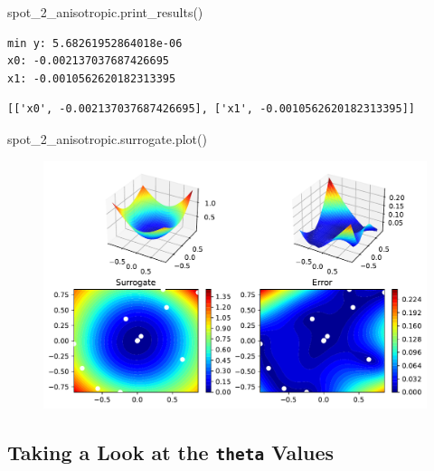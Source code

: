 \documentclass[
  letterpaper,
  DIV=11,
  numbers=noendperiod]{scrreprt}
\newenvironment{Shaded}{\begin{snugshade}}{\end{snugshade}}
\newcommand{\NormalTok}[1]{\textcolor[rgb]{0.00,0.23,0.31}{#1}}
\begin{document}
\begin{Shaded}
\begin{Highlighting}[]
\NormalTok{spot\_2\_anisotropic.print\_results()}
\end{Highlighting}
\end{Shaded}

\begin{verbatim}
min y: 5.68261952864018e-06
x0: -0.002137037687426695
x1: -0.0010562620182313395
\end{verbatim}

\begin{verbatim}
[['x0', -0.002137037687426695], ['x1', -0.0010562620182313395]]
\end{verbatim}

\begin{Shaded}
\begin{Highlighting}[]
\NormalTok{spot\_2\_anisotropic.surrogate.plot()}
\end{Highlighting}
\end{Shaded}

\begin{figure}[H]

{\centering \includegraphics{009_num_spot_anisotropic_files/figure-pdf/cell-11-output-1.pdf}

}

\end{figure}

\hypertarget{taking-a-look-at-the-theta-values}{%
\subsection{\texorpdfstring{Taking a Look at the \texttt{theta}
Values}{Taking a Look at the theta Values}}\label{taking-a-look-at-the-theta-values}}
\end{document}
